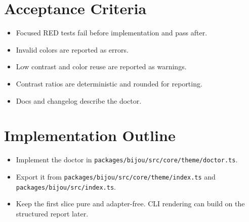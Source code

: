 \section{Acceptance Criteria}\label{record-176-acceptance-criteria}

\begin{itemize}
\tightlist
\item
  Focused RED tests fail before implementation and pass after.
\item
  Invalid colors are reported as errors.
\item
  Low contrast and color reuse are reported as warnings.
\item
  Contrast ratios are deterministic and rounded for reporting.
\item
  Docs and changelog describe the doctor.
\end{itemize}

\section{Implementation Outline}\label{record-176-implementation-outline}

\begin{itemize}
\tightlist
\item
  Implement the doctor in \texttt{p\allowbreak{}a\allowbreak{}c\allowbreak{}k\allowbreak{}a\allowbreak{}g\allowbreak{}e\allowbreak{}s\allowbreak{}/\allowbreak{}b\allowbreak{}i\allowbreak{}j\allowbreak{}o\allowbreak{}u\allowbreak{}/\allowbreak{}s\allowbreak{}r\allowbreak{}c\allowbreak{}/\allowbreak{}c\allowbreak{}o\allowbreak{}r\allowbreak{}e\allowbreak{}/\allowbreak{}t\allowbreak{}h\allowbreak{}e\allowbreak{}m\allowbreak{}e\allowbreak{}/\allowbreak{}d\allowbreak{}o\allowbreak{}c\allowbreak{}t\allowbreak{}o\allowbreak{}r\allowbreak{}.\allowbreak{}t\allowbreak{}s}.
\item
  Export it from \texttt{p\allowbreak{}a\allowbreak{}c\allowbreak{}k\allowbreak{}a\allowbreak{}g\allowbreak{}e\allowbreak{}s\allowbreak{}/\allowbreak{}b\allowbreak{}i\allowbreak{}j\allowbreak{}o\allowbreak{}u\allowbreak{}/\allowbreak{}s\allowbreak{}r\allowbreak{}c\allowbreak{}/\allowbreak{}c\allowbreak{}o\allowbreak{}r\allowbreak{}e\allowbreak{}/\allowbreak{}t\allowbreak{}h\allowbreak{}e\allowbreak{}m\allowbreak{}e\allowbreak{}/\allowbreak{}i\allowbreak{}n\allowbreak{}d\allowbreak{}e\allowbreak{}x\allowbreak{}.\allowbreak{}t\allowbreak{}s} and \texttt{p\allowbreak{}a\allowbreak{}c\allowbreak{}k\allowbreak{}a\allowbreak{}g\allowbreak{}e\allowbreak{}s\allowbreak{}/\allowbreak{}b\allowbreak{}i\allowbreak{}j\allowbreak{}o\allowbreak{}u\allowbreak{}/\allowbreak{}s\allowbreak{}r\allowbreak{}c\allowbreak{}/\allowbreak{}i\allowbreak{}n\allowbreak{}d\allowbreak{}e\allowbreak{}x\allowbreak{}.\allowbreak{}t\allowbreak{}s}.
\item
  Keep the first slice pure and adapter-free. CLI rendering can build on the structured report later.
\end{itemize}

